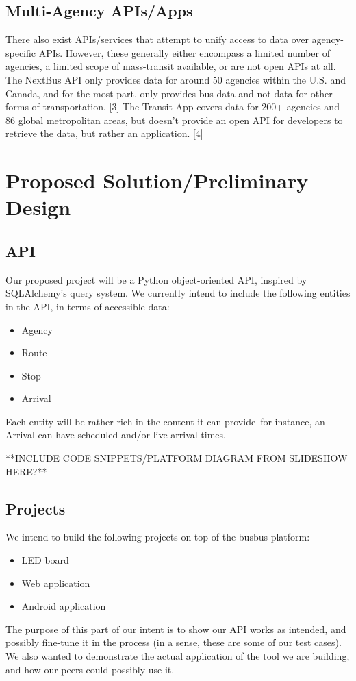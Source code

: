 \documentclass[12pt]{article}
\begin{document}
\subsection{Multi-Agency APIs/Apps}
There also exist APIs/services that attempt to unify access to data over agency-specific APIs.
However, these generally either encompass a limited number of agencies, a limited scope
of mass-transit available, or are not open APIs at all. The NextBus API only provides data for
around 50 agencies within the U.S. and Canada, and for the most part, only provides bus data 
and not data for other forms of transportation. [3] The Transit App covers data for 200+ agencies
and 86 global metropolitan areas, but doesn't provide an open API for developers to retrieve the
data, but rather an application. [4]


\section{Proposed Solution/Preliminary Design}
\subsection{API}
Our proposed project will be a Python object-oriented API, inspired by SQLAlchemy's query system.
We currently intend to include the following entities in the API, in terms of accessible data:
\begin{itemize}
\item Agency
\item Route
\item Stop
\item Arrival
\end{itemize}
Each entity will be rather rich in the content it can provide--for instance, an Arrival can have scheduled
and/or live arrival times.

**INCLUDE CODE SNIPPETS/PLATFORM DIAGRAM FROM SLIDESHOW HERE?**

\subsection{Projects}
We intend to build the following projects on top of the busbus platform:
\begin{itemize}
\item LED board
\item Web application
\item Android application
\end{itemize}
The purpose of this part of our intent is to show our API works as intended, and possibly
fine-tune it in the process (in a sense, these are some of our test cases). We also wanted 
to demonstrate the actual application of the tool we are building, and how our peers
could possibly use it.
\end{document}
